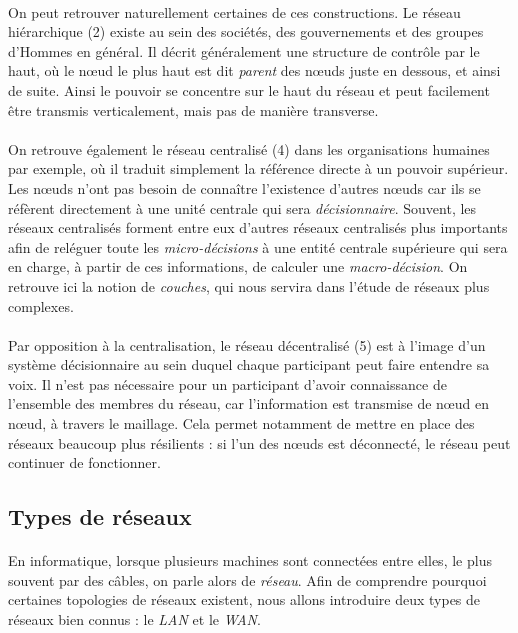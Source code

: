 \paragraph{} On peut retrouver naturellement certaines de ces constructions. Le réseau hiérarchique (2) existe
au sein des sociétés, des gouvernements et des groupes d'Hommes en général. Il décrit généralement une structure
de contrôle par le haut, où le n\oe{}ud le plus haut est dit \emph{parent} des n\oe{}uds juste en dessous, et ainsi de suite.
Ainsi le pouvoir se concentre sur le haut du réseau et peut facilement être transmis verticalement, mais pas de 
manière transverse.

\paragraph{} On retrouve également le réseau centralisé (4) dans les organisations humaines par exemple,
où il traduit simplement la référence directe à un pouvoir supérieur. Les n\oe{}uds n'ont pas besoin de connaître
l'existence d'autres n\oe{}uds car ils se réfèrent directement à une unité centrale qui sera \emph{décisionnaire}.
Souvent, les réseaux centralisés forment entre eux d'autres réseaux centralisés plus importants afin de reléguer
toute les \emph{micro-décisions} à une entité centrale supérieure qui sera en charge, à partir de ces informations,
de calculer une \emph{macro-décision}. On retrouve ici la notion de \emph{couches}, qui nous servira dans l'étude
de réseaux plus complexes.

\paragraph{} Par opposition à la centralisation, le réseau décentralisé (5) est à l'image d'un système décisionnaire au
sein duquel chaque participant peut faire entendre sa voix. Il n'est pas nécessaire pour un participant d'avoir connaissance
de l'ensemble des membres du réseau, car l'information est transmise de n\oe{}ud en n\oe{}ud, à travers le maillage.
Cela permet notamment de mettre en place des réseaux beaucoup plus résilients : si l'un des n\oe{}uds est déconnecté,
le réseau peut continuer de fonctionner.


\subsection*{Types de réseaux}

\paragraph{} En informatique, lorsque plusieurs machines sont connectées entre elles, le plus souvent par des câbles, on
parle alors de \emph{réseau}. Afin de comprendre pourquoi certaines topologies de réseaux existent, nous allons introduire 
deux types de réseaux bien connus : le \emph{LAN} et le \emph{WAN}.

